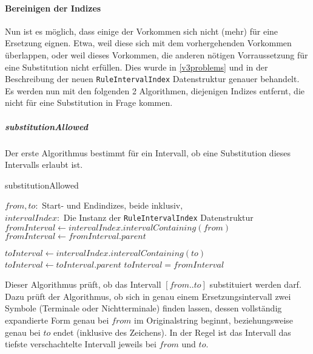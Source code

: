 \paragraph{Bereinigen der Indizes}

Nun ist es möglich, dass einige der Vorkommen sich nicht (mehr) für eine Ersetzung eignen. Etwa, weil diese sich mit dem vorhergehenden Vorkommen überlappen, oder weil dieses Vorkommen, die anderen nötigen Vorraussetzung für eine Substitution nicht erfüllen. Dies wurde in \ref{v3problems} und in der Beschreibung der neuen \texttt{RuleIntervalIndex} Datenstruktur genauer behandelt. Es werden nun mit den folgenden 2 Algorithmen, diejenigen Indizes entfernt, die nicht für eine Substitution in Frage kommen.

\subparagraph{substitutionAllowed}

Der erste Algorithmus bestimmt für ein Intervall, ob eine Substitution dieses Intervalls erlaubt ist. 

\begin{algorithm}
    \begin{algorithmic}
        \caption{substitutionAllowed}
        \REQUIRE $from, to: $ Start- und Endindizes, beide inklusiv,\\$intervalIndex: $ Die Instanz der \texttt{RuleIntervalIndex} Datenstruktur
        \STATE $ $
        \STATE $fromInterval \leftarrow intervalIndex.intervalContaining(from)$
            \STATE $fromInterval \leftarrow fromInterval.parent$
        \ENDWHILE

            \RETURN \FALSE
        \ENDIF

        \STATE $toInterval \leftarrow intervalIndex.intervalContaining(to)$
            \STATE $toInterval \leftarrow toInterval.parent$
        \ENDWHILE
        \RETURN $toInterval = fromInterval$
    \end{algorithmic}
\end{algorithm}
Dieser Algorithmus prüft, ob das Intervall $[from..to]$ substituiert werden darf. Dazu prüft der Algorithmus, ob sich in genau einem Ersetzungsintervall zwei Symbole (Terminale oder Nichtterminale) finden lassen, dessen vollständig expandierte Form genau bei $from$ im Originalstring beginnt, beziehungsweise genau bei $to$ endet (inklusive des Zeichens).
In der Regel ist das Intervall das tiefste verschachtelte Intervall jeweils bei $from$ und $to$. 

